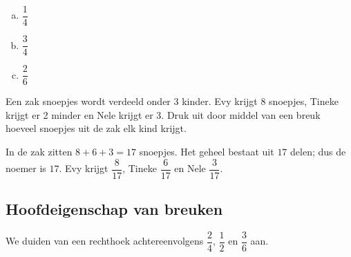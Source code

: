 \documentclass[12pt]{article}
\begin{document}
\begin{solution}
\begin{multicols}{3}
\begin{enumerate}[(a)]
  \item $\dfrac{1}{4}$
  \item $\dfrac{3}{4}$
  \item $\dfrac{2}{6}$
\end{enumerate}
\end{multicols}
\end{solution}

\begin{exercise}
Een zak snoepjes wordt verdeeld onder 3 kinder. Evy krijgt 8 snoepjes, Tineke krijgt er 2 minder en Nele krijgt er 3. Druk uit door middel van een breuk hoeveel snoepjes uit de zak elk kind krijgt.
\end{exercise}

\begin{solution}
In de zak zitten $8 + 6 + 3 = 17$ snoepjes.
Het geheel bestaat uit $17$ delen; dus de noemer is $17$.
Evy krijgt $\dfrac{8}{17}$, Tineke $\dfrac{6}{17}$ en Nele $\dfrac{3}{17}$. 
\end{solution}

\subsection{Hoofdeigenschap van breuken}

We duiden van een rechthoek achtereenvolgens $\dfrac{2}{4}$, $\dfrac{1}{2}$ en $\dfrac{3}{6}$ aan.

\newcommand{\drawbox}[4]
{
\draw [line width=1.6pt] (#1,#2) -- (#3,#2) -- (#3,#4) -- (#1,#4) -- cycle;
}
\newcommand{\fillbox}[4]
{
\draw [line width=1.6pt] (#1,#2) -- (#3,#2) -- (#3,#4) -- (#1,#4) -- cycle;
\fill [fill opacity=0.23] (#1,#2) -- (#3,#2) -- (#3,#4) -- (#1,#4) -- cycle;
}
\end{document}
